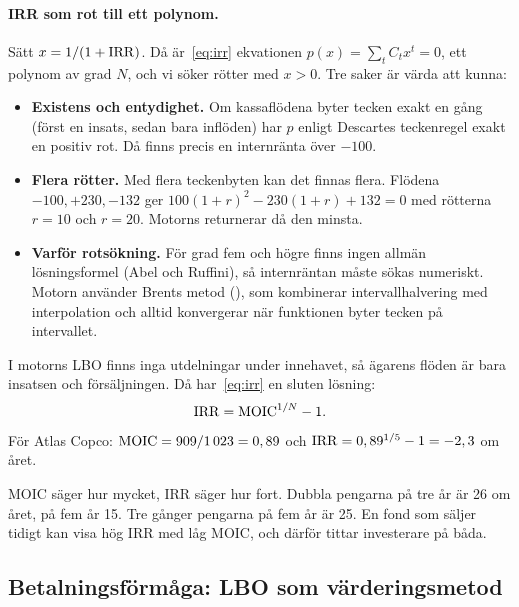 \paragraph{IRR som rot till ett polynom.} Sätt $x = 1/(1+\mathrm{IRR})$. Då är~\eqref{eq:irr} ekvationen
$p(x) = \sum_t C_t x^t = 0$, ett polynom av grad $N$, och vi söker rötter med $x > 0$. Tre
saker är värda att kunna:

\begin{itemize}
  \item \textbf{Existens och entydighet.} Om kassaflödena byter tecken exakt en gång (först en
    insats, sedan bara inflöden) har $p$ enligt Descartes teckenregel exakt en positiv rot. Då
    finns precis en internränta över $-100$\pct.
  \item \textbf{Flera rötter.} Med flera teckenbyten kan det finnas flera. Flödena
    $-100, +230, -132$ ger $100(1+r)^2 - 230(1+r) + 132 = 0$ med rötterna $r = 10$\pct{} och
    $r = 20$\pct. Motorns  returnerar då den minsta.
  \item \textbf{Varför rotsökning.} För grad fem och högre finns ingen allmän lösningsformel
    (Abel och Ruffini), så internräntan måste sökas numeriskt. Motorn använder Brents metod
    (), som kombinerar intervallhalvering med interpolation och
    alltid konvergerar när funktionen byter tecken på intervallet.
\end{itemize}

I motorns LBO finns inga utdelningar under innehavet, så ägarens flöden är bara insatsen och
försäljningen. Då har~\eqref{eq:irr} en sluten lösning:
\begin{equation}
  \mathrm{IRR} = \mathrm{MOIC}^{1/N} - 1 .
  \label{eq:irr-moic}
\end{equation}
För Atlas Copco: $\mathrm{MOIC} = 909/1\,023 = 0,89$ och $\mathrm{IRR} = 0,89^{1/5} - 1 = -2,3$\pct{} om året.

\begin{komihag}
MOIC säger hur mycket, IRR säger hur fort. Dubbla pengarna på tre år är 26\pct{} om året, på
fem år 15\pct. Tre gånger pengarna på fem år är 25\pct. En fond som säljer tidigt kan visa hög
IRR med låg MOIC, och därför tittar investerare på båda.
\end{komihag}

\subsection{Betalningsförmåga: LBO som värderingsmetod}

